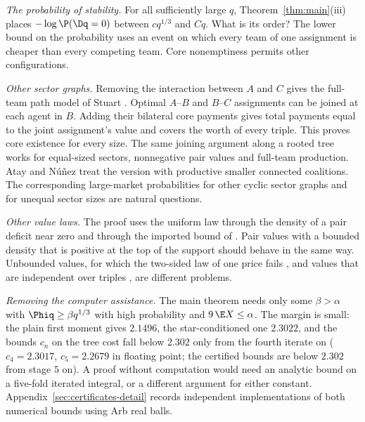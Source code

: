 \emph{The probability of stability.}
For all sufficiently large $q$, Theorem~\ref{thm:main}(iii) places
$-\log\P(\Dq=0)$ between $cq^{1/3}$ and $Cq$. What is its order?
The lower bound on the probability uses an event on which every team of one assignment
is cheaper than every competing team. Core nonemptiness permits other configurations.

\emph{Other sector graphs.}
Removing the interaction between $A$ and $C$ gives the full-team path model of
Stuart \cite{Stuart97}. Optimal $A$--$B$ and $B$--$C$ assignments can be joined at
each agent in $B$. Adding their bilateral core payments gives total payments equal
to the joint assignment's value and covers the worth of every triple. This proves
core existence for every size. The same joining argument along a rooted tree works
for equal-sized sectors, nonnegative pair values and full-team production. Atay and
N\'u\~nez \cite{AtayNunez19} treat the version with productive smaller connected
coalitions. The corresponding large-market probabilities for other cyclic sector
graphs and for unequal sector sizes are natural questions.

\emph{Other value laws.} The proof uses the uniform law through the density of a pair
deficit near zero and through the imported bound of \cite{FPT20}. Pair values with a bounded
density that is positive at the top of the support should behave in the same way. Unbounded
values, for which the two-sided law of one price fails \cite{HassidimRomm15}, and values
that are independent over triples \cite{Lucas95,MMR05}, are different problems.

\emph{Removing the computer assistance.} The main theorem needs only some $\beta>\alpha$
with $\Phiq\ge\beta q^{1/3}$ with high probability and $9\,\E X\le\alpha$. The margin is
small: the plain first moment gives $2.1496$, the star-conditioned one $2.3022$, and the
bounds $c_n$ on the tree cost fall below $2.302$ only from the fourth iterate on
($c_4=2.3017$, $c_5=2.2679$ in floating point; the certified bounds are below $2.302$ from
stage $5$ on). A proof without computation would need an analytic bound on a five-fold
iterated integral, or a different argument for either constant. Appendix~\ref{sec:certificates-detail}
records independent implementations of both numerical bounds using Arb real balls.

